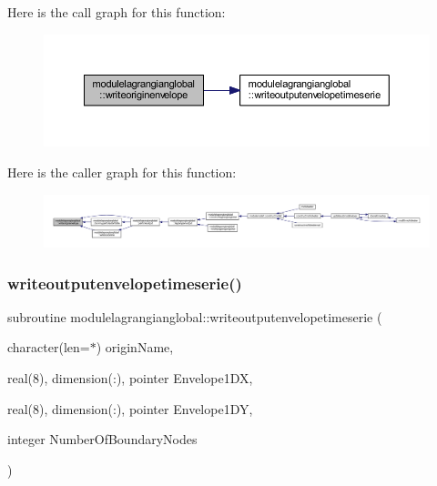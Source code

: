 Here is the call graph for this function\+:\nopagebreak
\begin{figure}[H]
\begin{center}
\leavevmode
\includegraphics[width=350pt]{namespacemodulelagrangianglobal_a50d81f13e10670a1b2e699246cbdaf1f_cgraph}
\end{center}
\end{figure}
Here is the caller graph for this function\+:\nopagebreak
\begin{figure}[H]
\begin{center}
\leavevmode
\includegraphics[width=350pt]{namespacemodulelagrangianglobal_a50d81f13e10670a1b2e699246cbdaf1f_icgraph}
\end{center}
\end{figure}
\mbox{\label{namespacemodulelagrangianglobal_a730caaa1e8cb909c0d86b6d7c081175c}} 
\subsubsection{\texorpdfstring{writeoutputenvelopetimeserie()}{writeoutputenvelopetimeserie()}}
{\footnotesize\ttfamily subroutine modulelagrangianglobal\+::writeoutputenvelopetimeserie (\begin{DoxyParamCaption}\item[{character(len=$\ast$)}]{origin\+Name,  }\item[{real(8), dimension(\+:), pointer}]{Envelope1\+DX,  }\item[{real(8), dimension(\+:), pointer}]{Envelope1\+DY,  }\item[{integer}]{Number\+Of\+Boundary\+Nodes }\end{DoxyParamCaption})\hspace{0.3cm}{\ttfamily [private]}}

